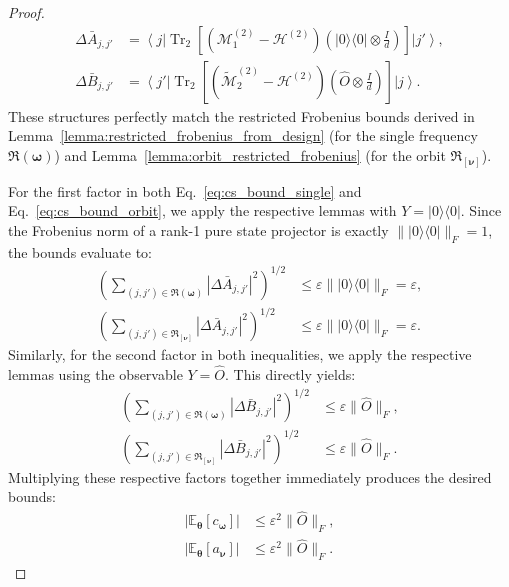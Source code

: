 \documentclass[%
 reprint,
 amsmath,amssymb,
 aps,
 pra,
]{revtex4-2}
\theoremstyle{definition}
\begin{document}
\begin{proof}
\begin{align*}
\Delta\bar A_{j,j'} &= \left\langle j\right| \operatorname{Tr}_2 \left[ \left( \mathcal M^{(2)}_1-\mathcal H^{(2)} \right) \left( |0\rangle\langle0|\otimes\frac{I}{d} \right) \right] \left|j'\right\rangle, \\
\Delta\bar B_{j,j'} &= \left\langle j'\right| \operatorname{Tr}_2 \left[ \left( \widetilde{\mathcal M}^{(2)}_2-\mathcal H^{(2)} \right) \left( \hat O\otimes\frac{I}{d} \right) \right] \left|j\right\rangle.
\end{align*}
These structures perfectly match the restricted Frobenius bounds derived in Lemma~\ref{lemma:restricted_frobenius_from_design} (for the single frequency $\mathfrak R(\bm{\omega})$) and Lemma~\ref{lemma:orbit_restricted_frobenius} (for the orbit $\mathfrak R_{[\bm{\nu}]}$).

For the first factor in both Eq.~\eqref{eq:cs_bound_single} and Eq.~\eqref{eq:cs_bound_orbit}, we apply the respective lemmas with $Y = |0\rangle\langle0|$. Since the Frobenius norm of a rank-1 pure state projector is exactly $\||0\rangle\langle0|\|_F = 1$, the bounds evaluate to:
\begin{align}
\left( \sum_{(j,j')\in\mathfrak R(\bm{\omega})} |\Delta\bar A_{j,j'}|^2 \right)^{1/2} &\leq \varepsilon \||0\rangle\langle0|\|_F = \varepsilon, \\
\left( \sum_{(j,j')\in\mathfrak R_{[\bm{\nu}]}} |\Delta\bar A_{j,j'}|^2 \right)^{1/2} &\leq \varepsilon \||0\rangle\langle0|\|_F = \varepsilon.
\end{align}
Similarly, for the second factor in both inequalities, we apply the respective lemmas using the observable $Y = \hat O$. This directly yields:
\begin{align}
\left( \sum_{(j,j')\in\mathfrak R(\bm{\omega})} |\Delta\bar B_{j,j'}|^2 \right)^{1/2} &\leq \varepsilon \|\hat O\|_F, \\
\left( \sum_{(j,j')\in\mathfrak R_{[\bm{\nu}]}} |\Delta\bar B_{j,j'}|^2 \right)^{1/2} &\leq \varepsilon \|\hat O\|_F.
\end{align}
Multiplying these respective factors together immediately produces the desired bounds:
\begin{align}
\left| \mathbb{E}_{\bm{\theta}} [ c_{\bm{\omega}} ] \right| &\leq \varepsilon^2\|\hat O\|_F, \\
\left| \mathbb{E}_{\bm{\theta}} [ a_{\bm{\nu}} ] \right| &\leq \varepsilon^2\|\hat O\|_F.
\end{align}
\end{proof}
\end{document}
